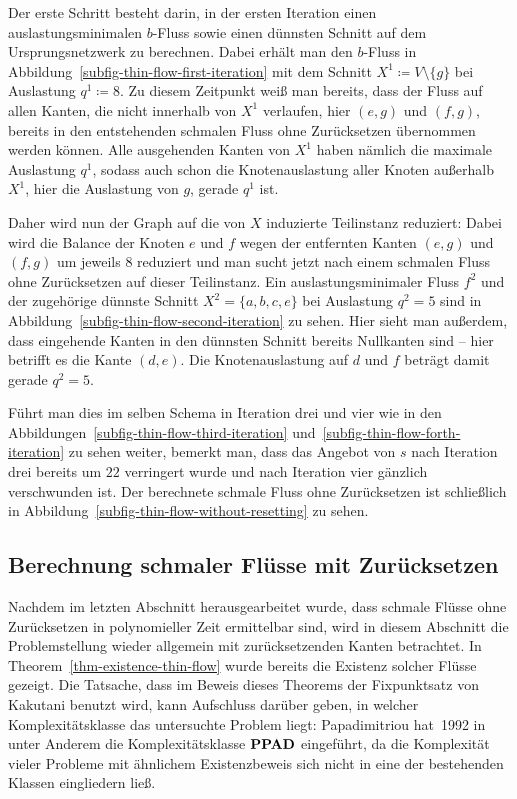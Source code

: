 \begin{example}
	Der erste Schritt besteht darin, in der ersten Iteration einen auslastungsminimalen $b$-Fluss sowie einen dünnsten Schnitt auf dem Ursprungsnetzwerk zu berechnen.
	Dabei erhält man den $b$-Fluss in Abbildung~\ref{subfig-thin-flow-first-iteration} mit dem Schnitt $X^1\coloneq V \setminus \{ g \}$ bei Auslastung $q^1 \coloneq 8$.
	Zu diesem Zeitpunkt weiß man bereits, dass der Fluss auf allen Kanten, die nicht innerhalb von $X^1$ verlaufen, hier $(e,g)$ und $(f,g)$, bereits in den entstehenden schmalen Fluss ohne Zurücksetzen übernommen werden können.
	Alle ausgehenden Kanten von $X^1$ haben nämlich die maximale Auslastung $q^1$, sodass auch schon die Knotenauslastung aller Knoten außerhalb $X^1$, hier die Auslastung von $g$, gerade $q^1$ ist.

	Daher wird nun der Graph auf die von $X$ induzierte Teilinstanz reduziert:
	Dabei wird die Balance der Knoten $e$ und $f$ wegen der entfernten Kanten $(e,g)$ und $(f,g)$ um jeweils $8$ reduziert und man sucht jetzt nach einem schmalen Fluss ohne Zurücksetzen auf dieser Teilinstanz.
	Ein auslastungsminimaler Fluss $f^2$ und der zugehörige dünnste Schnitt $X^2 = \{ a, b, c, e \}$ bei Auslastung $q^2 = 5$ sind in Abbildung~\ref{subfig-thin-flow-second-iteration} zu sehen.
	Hier sieht man außerdem, dass eingehende Kanten in den dünnsten Schnitt bereits Nullkanten sind -- hier betrifft es die Kante $(d,e)$.
	Die Knotenauslastung auf $d$ und $f$ beträgt damit gerade $q^2=5$.
	
	Führt man dies im selben Schema in Iteration drei und vier wie in den Abbildungen~\ref{subfig-thin-flow-third-iteration} und~\ref{subfig-thin-flow-forth-iteration} zu sehen weiter, bemerkt man, dass das Angebot von $s$ nach Iteration drei bereits um $22$ verringert wurde und nach Iteration vier gänzlich verschwunden ist.
	Der berechnete schmale Fluss ohne Zurücksetzen ist schließlich in Abbildung~\ref{subfig-thin-flow-without-resetting} zu sehen.
\end{example}

\subsection{Berechnung schmaler Flüsse mit Zurücksetzen}

\newcommand{\EndOfTheLine}{\textit{\textsc{EndOfALine}}}

Nachdem im letzten Abschnitt herausgearbeitet wurde, dass schmale Flüsse ohne Zurücksetzen in polynomieller Zeit ermittelbar sind, wird in diesem Abschnitt die Problemstellung wieder allgemein mit zurücksetzenden Kanten betrachtet.
In Theorem~\ref{thm-existence-thin-flow} wurde bereits die Existenz solcher Flüsse gezeigt.
Die Tatsache, dass im Beweis dieses Theorems der Fixpunktsatz von Kakutani benutzt wird, kann Aufschluss darüber geben, in welcher Komplexitätsklasse das untersuchte Problem liegt:
Papadimitriou hat~1992 in~\cite{PPAD1994} unter Anderem die Komplexitätsklasse $\textbf{PPAD}$ eingeführt, da die Komplexität vieler Probleme mit ähnlichem Existenzbeweis sich nicht in eine der bestehenden Klassen eingliedern ließ.

